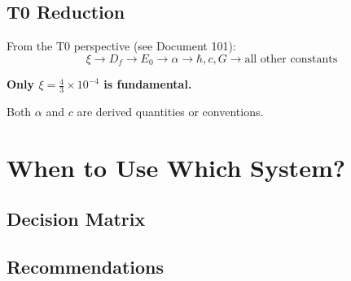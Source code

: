 	\subsection{T0 Reduction}
	
	From the T0 perspective (see Document 101):
	\begin{equation}
		\xi \to D_f \to E_0 \to \alpha \to \hbar, c, G \to \text{all other constants}
	\end{equation}
	
	\textbf{Only $\xi = \frac{4}{3} \times 10^{-4}$ is fundamental.}
	
	Both $\alpha$ and $c$ are derived quantities or conventions.
	
	\section{When to Use Which System?}
	
	\subsection{Decision Matrix}
	
	\begin{table}[h]
		\centering
		\caption{Application domains of unit systems}
	\end{table}
	
	\subsection{Recommendations}
	
